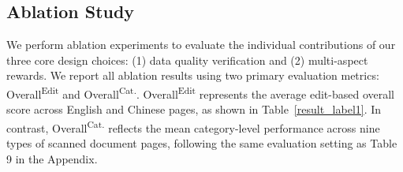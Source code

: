 







\subsection{Ablation Study}

We perform ablation experiments to evaluate the individual contributions of our three core design choices: (1) data quality verification and (2) multi-aspect rewards. We report all ablation results using two primary evaluation metrics: Overall\textsuperscript{Edit} and Overall\textsuperscript{Cat.}. Overall\textsuperscript{Edit} represents the average edit-based overall score across English and Chinese pages, as shown in Table~\ref{result_label1}. In contrast, Overall\textsuperscript{Cat.} reflects the mean category-level performance across nine types of scanned document pages, following the same evaluation setting as Table 9 in the Appendix.  


